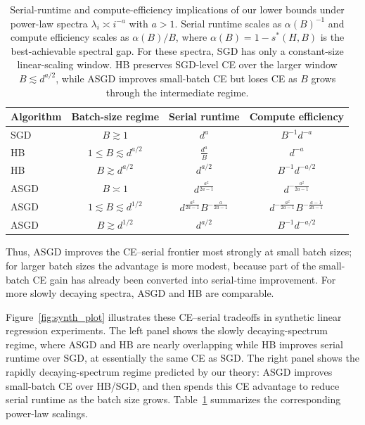 \documentclass{article}
\begin{document}
\begin{table}[!htp]
\centering
\small
\begin{tabular}{lccc}
\toprule
Algorithm & Batch-size regime & Serial runtime & Compute efficiency \\
\midrule
SGD
& $B \gtrsim 1$
& $d^a$
& $B^{-1}d^{-a}$
\\
\midrule
HB
& $1 \le B \lesssim d^{a/2}$
& $\frac{d^a}{B}$
& $d^{-a}$
\\
HB
& $B \gtrsim d^{a/2}$
& $d^{a/2}$
& $B^{-1}d^{-a/2}$
\\
\midrule
ASGD
& $B \asymp 1$
& $d^{\frac{a^2}{2a-1}}$
& $d^{-\frac{a^2}{2a-1}}$
\\
ASGD
& $1 \lesssim B \lesssim d^{1/2}$
& $d^{\frac{a^2}{2a-1}}B^{-\frac{a}{2a-1}}$
& $d^{-\frac{a^2}{2a-1}}B^{-\frac{a-1}{2a-1}}$
\\
ASGD
& $B \gtrsim d^{1/2}$
& $d^{a/2}$
& $B^{-1}d^{-a/2}$
\\
\bottomrule
\end{tabular}
\vspace{2mm}
\caption{
Serial-runtime and compute-efficiency implications of our lower bounds under
power-law spectra $\lambda_i\asymp i^{-a}$ with $a>1$. Serial runtime scales as
$\alpha(B)^{-1}$ and compute efficiency scales as $\alpha(B)/B$, where
$\alpha(B)=1-s^*(H,B)$ is the best-achievable spectral gap. For these spectra,
SGD has only a constant-size linear-scaling window. HB preserves SGD-level CE
over the larger window $B\lesssim d^{a/2}$, while ASGD improves small-batch CE
but loses CE as $B$ grows through the intermediate regime.
}
\vspace{-5mm}
\label{tab:batch-regimes}
\end{table}
Thus, ASGD improves
the CE--serial frontier most strongly at small batch sizes; for larger batch
sizes the advantage is more modest, because part of the small-batch CE gain has
already been converted into serial-time improvement. For more slowly decaying
spectra, ASGD and HB are comparable.

Figure~\ref{fig:synth_plot} illustrates these CE--serial tradeoffs in synthetic
linear regression experiments. The left panel shows the slowly decaying-spectrum
regime, where ASGD and HB are nearly overlapping while HB improves serial
runtime over SGD, at essentially the same CE as SGD. The right panel shows the rapidly decaying-spectrum regime predicted by our theory: ASGD improves small-batch CE over HB/SGD, and then spends this CE advantage to reduce serial runtime as the batch size grows. Table~\ref{tab:batch-regimes} summarizes the corresponding power-law scalings.
\end{document}
